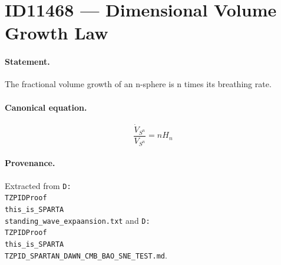 \section*{ID11468 --- Dimensional Volume Growth Law}

\paragraph{Statement.}
The fractional volume growth of an n-sphere is n times its breathing rate.

\paragraph{Canonical equation.}
\[
\frac{\dot V_{S^n}}{V_{S^n}}=nH_n
\]

\paragraph{Provenance.}
Extracted from \texttt{D:\\TZPIDProof\\this\_is\_SPARTA\\standing\_wave\_expaansion.txt} and \texttt{D:\\TZPIDProof\\this\_is\_SPARTA\\TZPID\_SPARTAN\_DAWN\_CMB\_BAO\_SNE\_TEST.md}.

